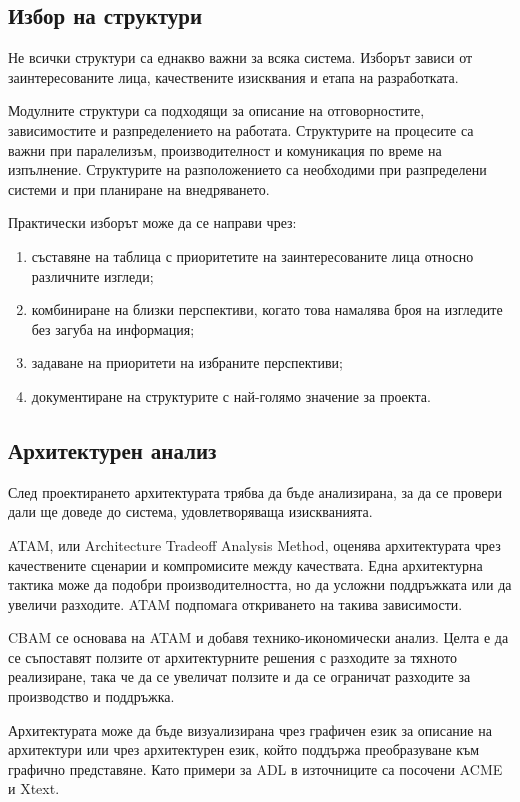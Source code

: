 \subsection{Избор на структури}\label{s:27.6.2}

Не всички структури са еднакво важни за всяка система. Изборът зависи от заинтересованите лица, качествените изисквания и етапа на разработката.

Модулните структури са подходящи за описание на отговорностите, зависимостите и разпределението на работата. Структурите на процесите са важни при паралелизъм, производителност и комуникация по време на изпълнение. Структурите на разположението са необходими при разпределени системи и при планиране на внедряването.

Практически изборът може да се направи чрез:

\begin{enumerate}
    \item съставяне на таблица с приоритетите на заинтересованите лица относно различните изгледи;
    \item комбиниране на близки перспективи, когато това намалява броя на изгледите без загуба на информация;
    \item задаване на приоритети на избраните перспективи;
    \item документиране на структурите с най-голямо значение за проекта.
\end{enumerate}

\subsection{Архитектурен анализ}\label{s:27.6.3}

След проектирането архитектурата трябва да бъде анализирана, за да се провери дали ще доведе до система, удовлетворяваща изискванията.

ATAM, или Architecture Tradeoff Analysis Method, оценява архитектурата чрез качествените сценарии и компромисите между качествата. Една архитектурна тактика може да подобри производителността, но да усложни поддръжката или да увеличи разходите. ATAM подпомага откриването на такива зависимости.

CBAM се основава на ATAM и добавя технико-икономически анализ. Целта е да се съпоставят ползите от архитектурните решения с разходите за тяхното реализиране, така че да се увеличат ползите и да се ограничат разходите за производство и поддръжка.

Архитектурата може да бъде визуализирана чрез графичен език за описание на архитектури или чрез архитектурен език, който поддържа преобразуване към графично представяне. Като примери за ADL в източниците са посочени ACME и Xtext.

